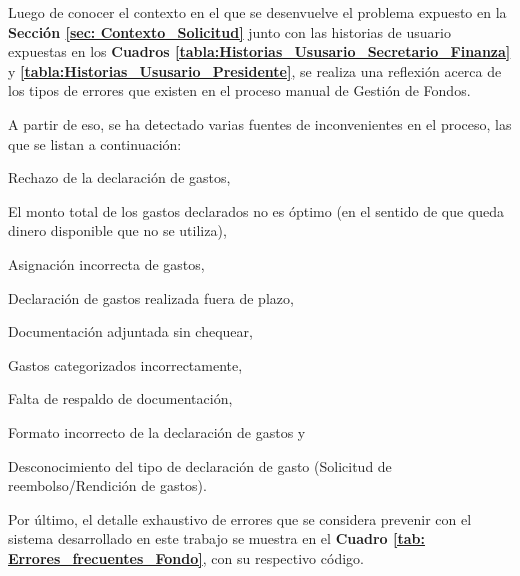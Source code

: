 

Luego de conocer el contexto en el que se desenvuelve el problema expuesto en la \textbf{Sección \ref{sec: Contexto_Solicitud}} junto con las historias de usuario expuestas en los \textbf{Cuadros \ref{tabla:Historias_Ususario_Secretario_Finanza}} y \textbf{\ref{tabla:Historias_Ususario_Presidente}}, se realiza una reflexión acerca de los tipos de errores que existen en el proceso manual de Gestión de Fondos.

A partir de eso, se ha detectado varias fuentes de inconvenientes en el proceso, las que se listan a continuación: \begin{enumerate*}[label=(\roman*)]
    \item Rechazo de la declaración de gastos,
    \item El monto total de los gastos declarados no es óptimo (en el sentido de que queda dinero disponible que no se utiliza),
    \item Asignación incorrecta de gastos,
    \item Declaración de gastos realizada fuera de plazo,
    \item Documentación adjuntada sin chequear,
    \item Gastos categorizados incorrectamente,
    \item Falta de respaldo de documentación,
    \item Formato incorrecto de la declaración de gastos y
    \item Desconocimiento del tipo de declaración de gasto (Solicitud de reembolso/Rendición de gastos).
\end{enumerate*}

Por último, el detalle exhaustivo de errores que se considera prevenir con el sistema desarrollado en este trabajo se muestra en el \textbf{Cuadro \ref{tab: Errores_frecuentes_Fondo}}, con su respectivo código.


